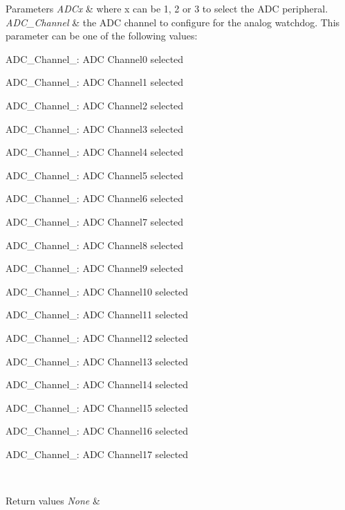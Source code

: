 \begin{DoxyParams}{Parameters}
{\em A\+D\+Cx} & where x can be 1, 2 or 3 to select the A\+DC peripheral. \\
\hline
{\em A\+D\+C\+\_\+\+Channel} & the A\+DC channel to configure for the analog watchdog. This parameter can be one of the following values\+: \begin{DoxyItemize}
\item A\+D\+C\+\_\+\+Channel\+\_\+: A\+DC Channel0 selected \item A\+D\+C\+\_\+\+Channel\+\_\+: A\+DC Channel1 selected \item A\+D\+C\+\_\+\+Channel\+\_\+: A\+DC Channel2 selected \item A\+D\+C\+\_\+\+Channel\+\_\+: A\+DC Channel3 selected \item A\+D\+C\+\_\+\+Channel\+\_\+: A\+DC Channel4 selected \item A\+D\+C\+\_\+\+Channel\+\_\+: A\+DC Channel5 selected \item A\+D\+C\+\_\+\+Channel\+\_\+: A\+DC Channel6 selected \item A\+D\+C\+\_\+\+Channel\+\_\+: A\+DC Channel7 selected \item A\+D\+C\+\_\+\+Channel\+\_\+: A\+DC Channel8 selected \item A\+D\+C\+\_\+\+Channel\+\_\+: A\+DC Channel9 selected \item A\+D\+C\+\_\+\+Channel\+\_\+: A\+DC Channel10 selected \item A\+D\+C\+\_\+\+Channel\+\_\+: A\+DC Channel11 selected \item A\+D\+C\+\_\+\+Channel\+\_\+: A\+DC Channel12 selected \item A\+D\+C\+\_\+\+Channel\+\_\+: A\+DC Channel13 selected \item A\+D\+C\+\_\+\+Channel\+\_\+: A\+DC Channel14 selected \item A\+D\+C\+\_\+\+Channel\+\_\+: A\+DC Channel15 selected \item A\+D\+C\+\_\+\+Channel\+\_\+: A\+DC Channel16 selected \item A\+D\+C\+\_\+\+Channel\+\_\+: A\+DC Channel17 selected \end{DoxyItemize}
\\
\hline
\end{DoxyParams}

\begin{DoxyRetVals}{Return values}
{\em None} & \\
\hline
\end{DoxyRetVals}


